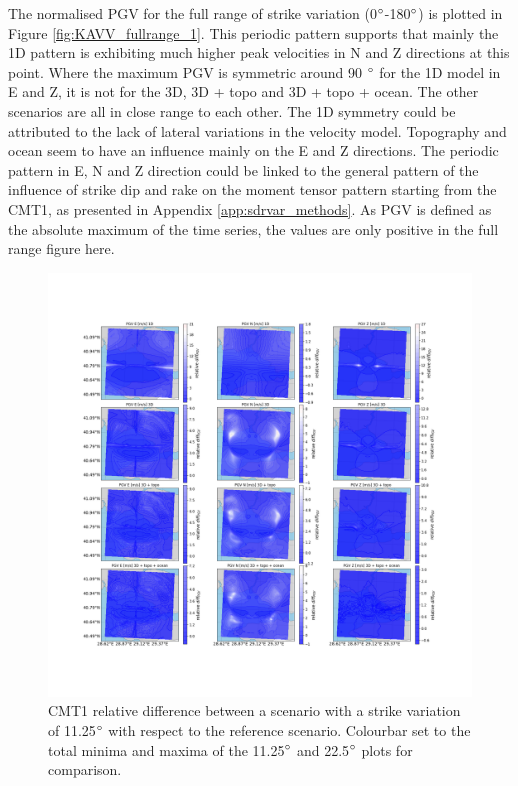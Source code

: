 \documentclass[../Text/00main.tex]{subfiles}
\begin{document}
The normalised PGV for the full range of strike variation (0$\degree$-180$\degree$) is plotted in Figure \ref{fig:KAVV_fullrange_1}. This periodic pattern supports that mainly the 1D pattern is exhibiting much higher peak velocities in N and Z directions at this point. Where the maximum PGV is symmetric around 90 $\degree$ for the 1D model in E and Z, it is not for the 3D, 3D + topo and 3D + topo + ocean. The other scenarios are all in close range to each other. The 1D symmetry could be attributed to the lack of lateral variations in the velocity model. Topography and ocean seem to have an influence mainly on the E and Z directions. The periodic pattern in E, N and Z direction could be linked to the general pattern of the influence of strike dip and rake on the moment tensor pattern starting from the CMT1, as presented in Appendix \ref{app:sdrvar_methods}. As PGV is defined as the absolute maximum of the time series, the values are only positive in the full range figure here. 

\begin{figure}[!htb]
    \centering
    \includegraphics[width=1\linewidth, trim = 2cm 5cm 1cm 5cm, clip]{images_results/strike_variation_epsilon12_sc1.png}
    \caption{CMT1 relative difference between a scenario with a strike variation of 11.25$\degree$ with respect to the reference scenario. Colourbar set to the total minima and maxima of the 11.25$\degree$ and 22.5$\degree$ plots for comparison.}
    \label{fig:ref_eps12-1}
\end{figure}
\end{document}
